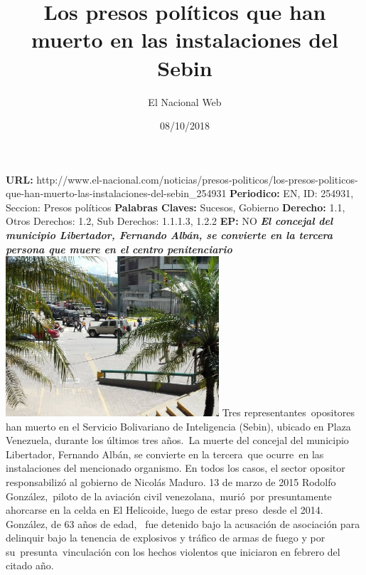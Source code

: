 \documentclass{article}%
\title{\textbf{Los presos políticos que han muerto en las instalaciones del Sebin}}%
\author{El Nacional Web}%
\date{08/10/2018}%
\begin{document}
%
\normalsize%
\maketitle%
\textbf{URL: }%
http://www.el{-}nacional.com/noticias/presos{-}politicos/los{-}presos{-}politicos{-}que{-}han{-}muerto{-}las{-}instalaciones{-}del{-}sebin\_254931\newline%
%
\textbf{Periodico: }%
EN, %
ID: %
254931, %
Seccion: %
Presos políticos\newline%
%
\textbf{Palabras Claves: }%
Sucesos, Gobierno\newline%
%
\textbf{Derecho: }%
1.1, %
Otros Derechos: %
1.2, %
Sub Derechos: %
1.1.1.3, 1.2.2\newline%
%
\textbf{EP: }%
NO\newline%
\newline%
%
\textbf{\textit{El concejal del municipio Libertador, Fernando Albán, se convierte en la tercera persona que muere en el centro penitenciario}}%
\newline%
\newline%
%
\includegraphics[width=300px]{75.jpg}%
\newline%
%
Tres representantes~opositores han muerto en el Servicio Bolivariano de Inteligencia (Sebin), ubicado en Plaza Venezuela, durante los últimos tres años.~La muerte del concejal del municipio Libertador, Fernando Albán, se convierte en la tercera~que ocurre~en las instalaciones del mencionado organismo. En todos los casos, el sector opositor responsabilizó al gobierno de Nicolás Maduro.%
\newline%
%
13 de marzo de 2015%
\newline%
%
Rodolfo González,~piloto de la aviación civil venezolana,~murió~por presuntamente ahorcarse en la celda en El Helicoide, luego de estar preso~desde el 2014. González, de 63 años de edad,~ fue detenido bajo la acusación de asociación para delinquir bajo la tenencia de explosivos y tráfico de armas de fuego y por su~presunta~vinculación con los hechos violentos que iniciaron en febrero del citado año.%
\end{document}
